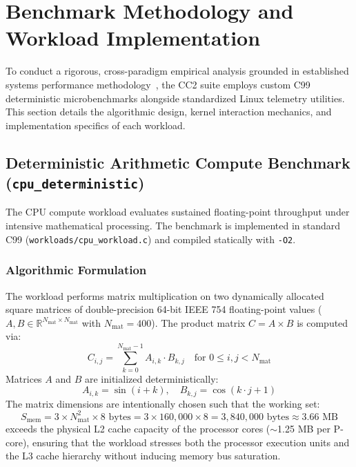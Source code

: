\section{Benchmark Methodology and Workload Implementation}
\label{sec:benchmark_methodology}

To conduct a rigorous, cross-paradigm empirical analysis grounded in established systems performance methodology~\cite{gregg2020systems}, the CC2 suite employs custom C99 deterministic microbenchmarks alongside standardized Linux telemetry utilities. This section details the algorithmic design, kernel interaction mechanics, and implementation specifics of each workload.

\subsection{Deterministic Arithmetic Compute Benchmark (\texttt{cpu\_deterministic})}
\label{subsec:cpu_methodology}

The CPU compute workload evaluates sustained floating-point throughput under intensive mathematical processing. The benchmark is implemented in standard C99 (\texttt{workloads/cpu\_workload.c}) and compiled statically with \texttt{-O2}.

\subsubsection{Algorithmic Formulation}
The workload performs matrix multiplication on two dynamically allocated square matrices of double-precision 64-bit IEEE 754 floating-point values ($A, B \in \mathbb{R}^{N_{\text{mat}} \times N_{\text{mat}}}$ with $N_{\text{mat}} = 400$). The product matrix $C = A \times B$ is computed via:
\begin{equation}
    C_{i,j} = \sum_{k=0}^{N_{\text{mat}}-1} A_{i,k} \cdot B_{k,j} \quad \text{for } 0 \le i, j < N_{\text{mat}}
\end{equation}
Matrices $A$ and $B$ are initialized deterministically:
\begin{equation}
    A_{i,k} = \sin(i + k), \quad B_{k,j} = \cos(k \cdot j + 1)
\end{equation}
The matrix dimensions are intentionally chosen such that the working set:
\begin{equation}
    S_{\text{mem}} = 3 \times N_{\text{mat}}^2 \times 8 \text{ bytes} = 3 \times 160,000 \times 8 = 3,840,000 \text{ bytes} \approx 3.66 \text{ MB}
\end{equation}
exceeds the physical L2 cache capacity of the processor cores ($\sim$1.25 MB per P-core), ensuring that the workload stresses both the processor execution units and the L3 cache hierarchy without inducing memory bus saturation.

